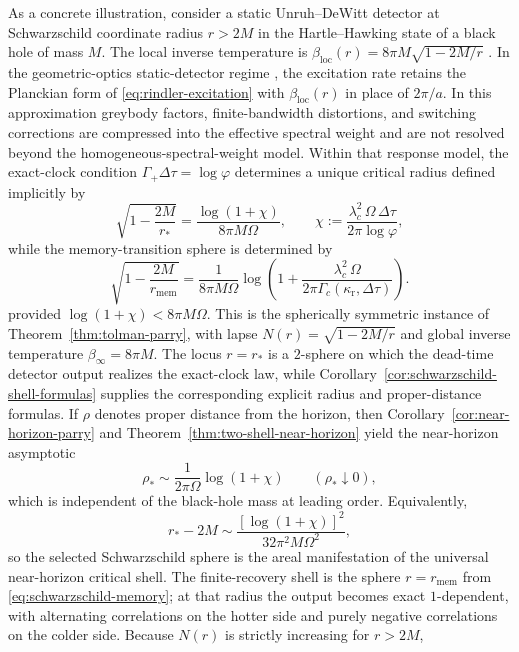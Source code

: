 \begin{example}\label{ex:schwarzschild}
As a concrete illustration, consider a static Unruh--DeWitt detector at Schwarzschild coordinate radius $r>2M$ in the Hartle--Hawking state of a black hole of mass $M$. The local inverse temperature is $\beta_{\mathrm{loc}}(r)=8\pi M\sqrt{1-2M/r}$ \cite{KayWald1991}. In the geometric-optics static-detector regime \cite{BirDav1982,Takagi1986}, the excitation rate retains the Planckian form of \eqref{eq:rindler-excitation} with $\beta_{\mathrm{loc}}(r)$ in place of $2\pi/a$. In this approximation greybody factors, finite-bandwidth distortions, and switching corrections are compressed into the effective spectral weight and are not resolved beyond the homogeneous-spectral-weight model. Within that response model, the exact-clock condition $\Gamma_+\Delta\tau=\log\varphi$ determines a unique critical radius defined implicitly by
\begin{equation}\label{eq:schwarzschild-parry}
\sqrt{1-\frac{2M}{r_*}}
=
\frac{\log(1+\chi)}{8\pi M\Omega},
\qquad
\chi:=\frac{\lambda_c^2\,\Omega\,\Delta\tau}{2\pi\log\varphi},
\end{equation}
while the memory-transition sphere is determined by
\begin{equation}\label{eq:schwarzschild-memory}
\sqrt{1-\frac{2M}{r_{\mathrm{mem}}}}
=
\frac{1}{8\pi M\Omega}
\log\!\left(
1+\frac{\lambda_c^2\,\Omega}{2\pi\Gamma_c(\kappa_{\mathrm r},\Delta\tau)}
\right).
\end{equation}
provided $\log(1+\chi)<8\pi M\Omega$. This is the spherically symmetric instance of Theorem~\ref{thm:tolman-parry}, with lapse $N(r)=\sqrt{1-2M/r}$ and global inverse temperature $\beta_\infty=8\pi M$. The locus $r=r_*$ is a $2$-sphere on which the dead-time detector output realizes the exact-clock law, while Corollary~\ref{cor:schwarzschild-shell-formulas} supplies the corresponding explicit radius and proper-distance formulas. If $\rho$ denotes proper distance from the horizon, then Corollary~\ref{cor:near-horizon-parry} and Theorem~\ref{thm:two-shell-near-horizon} yield the near-horizon asymptotic
\begin{equation}\label{eq:schwarzschild-rho-star}
\rho_*
\sim
\frac{1}{2\pi\Omega}\log(1+\chi)
\qquad
(\rho_*\downarrow 0),
\end{equation}
which is independent of the black-hole mass at leading order. Equivalently,
\[
r_*-2M
\sim
\frac{[\log(1+\chi)]^2}{32\pi^2 M\Omega^2},
\]
so the selected Schwarzschild sphere is the areal manifestation of the universal near-horizon critical shell. The finite-recovery shell is the sphere $r=r_{\mathrm{mem}}$ from \eqref{eq:schwarzschild-memory}; at that radius the output becomes exact $1$-dependent, with alternating correlations on the hotter side and purely negative correlations on the colder side. Because $N(r)$ is strictly increasing for $r>2M$,

\end{example}
